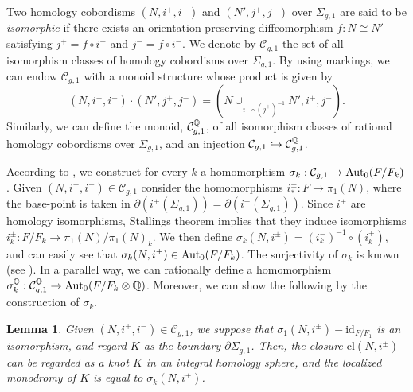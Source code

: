 \documentclass{article}
\theoremstyle{plain}
\newtheorem{thm}{Theorem}[section]
\newtheorem{lem}[thm]{Lemma}
\theoremstyle{definition}
\newcommand{\ra}{\rightarrow}
\newcommand{\Q}{{\Bbb Q}}
\newcommand{\Z}{{\Bbb Z}}
\newcommand{\Aut}{{\rm Aut}}
\newcommand{\Sp}{{\rm Sp}}
\begin{document}
{Two homology cobordisms $(N,i^+, i^-)$ and $(N', j^+, j^-)$ over $ \Sigma_{g,1} $ are said to be
{\it isomorphic} if there exists an orientation-preserving diffeomorphism $f : N \cong N'$
satisfying $j^+ = f \circ i^+$ and $j^- = f\circ i^-$. We denote by $\mathcal{C}_{g,1}$ the set of all isomorphism classes of homology cobordisms over $\Sigma_{g,1} $. By using markings, we can endow $\mathcal{C}_{g,1}$ with
a monoid structure whose product is given by
\[(N,i^+, i^-) \cdot (N', j^+, j^-) = ( N \cup_{i^- \circ (j^+)^{-1}} N', i^+, j^- ).\]
Similarly, we can define the monoid, $\mathcal{C}_{g,1}^{\Q}$, of all isomorphism classes of rational homology cobordisms over $ \Sigma_{g,1} $, and an injection $ \mathcal{C}_{g,1} \hookrightarrow \mathcal{C}_{g,1}^{\Q} $.

According to \cite{GL}, we construct for every $k$ a homomorphism $\sigma_k: \mathcal{C}_{g,1} \ra \Aut_0(F/F_k)$.
Given $(N, i^+, i^- ) \in \mathcal{C}_{g,1}$ consider the homomorphisms $i^{\pm} _*
: F \ra \pi_1 (N)$, where the base-point is
taken in $\partial ( i^+ (\Sigma_{g,1})) = \partial ( i^-(\Sigma_{g,1}))$. Since $i^{\pm}$ are homology isomorphisms, Stallings theorem implies
that they induce isomorphisms $i^{\pm} _k: F/F_k \ra \pi_1(N)/\pi_1(N)_k$.
We then define $\sigma_k (N, i^{\pm}) = (i_k^- )^{-1} \circ ( i^+_k)$,
and can easily see that $\sigma_k (N, i^{\pm}) \in \Aut_0(F/F_k) $. %
The surjectivity of $\sigma_k$ is known (see \cite[Theorem 3]{GL}).
In a parallel way, we can rationally define a homomorphism $\sigma_k^{\Q}: \mathcal{C}_{g,1}^{\Q} \ra \Aut_0(F/F_k \otimes \Q)$.
Moreover, we can show the following by the construction of $\sigma_k.$
\begin{lem}\label{ss38} Given $(N, i^+, i^- ) \in \mathcal{C}_{g,1}$,
we suppose that $ \sigma_1 (N, i^{\pm}) - \mathrm{id}_{F/F_1}$ is an isomorphism, and regard $K$ as the boundary $\partial \Sigma_{g,1}$. 
Then, the closure $ \mathrm{cl}(N,i^{\pm} )$ can be regarded as a knot $K$ in an integral homology sphere, and the localized monodromy of $K$ is equal to $ \sigma_k (N, i^{\pm}) $.


\end{lem}}
\end{document}
